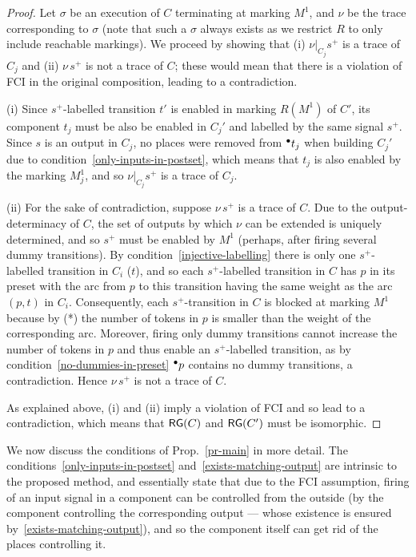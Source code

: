 \begin{proof}
Let $\sigma$ be an execution of $C$ terminating at marking $M^1$,
and $\nu$ be the trace corresponding to $\sigma$ (note that
such a $\sigma$ always exists as we restrict $R$ to only include reachable markings).
We proceed by showing that (i)
$\nu|_{C_j}s^+$ is a trace of $C_j$ and (ii) $\nu\, s^+$ is not
a trace of $C$; these would mean that there is a violation of
FCI in the original composition, leading to a contradiction.

(i) Since $s^+$-labelled transition $t'$ is enabled in marking $R(M^1)$ of $C'$, 
its component $t_j$ must be also be enabled in $C_j'$ and labelled by the same signal $s^+$.
Since $s$ is an output in $C_j$, no places were removed from ${}^\bullet {t_j}$ when building
$C_j'$ due to condition~\ref{only-inputs-in-postset}, which
means that $t_j$ is also enabled by the marking $M^1_j$, and so $\nu|_{C_j}s^+$
is a trace of $C_j$.

(ii) For the sake of contradiction, suppose $\nu\,s^+$ is a
trace of $C$. Due to the output-determinacy of $C$, the set of
outputs by which $\nu$ can be extended is uniquely determined,
and so $s^+$ must be enabled by $M^1$ (perhaps, after firing
several dummy transitions). By
condition~\ref{injective-labelling} there is only one
$s^+$-labelled transition in $C_i$ (\viz $t$), and so each
$s^+$-labelled transition in $C$ has $p$ in its preset with the
arc from $p$ to this transition having the same weight as the
arc $(p,t)$ in $C_i$. Consequently, each $s^+$-transition in
$C$ is blocked at marking $M^1$ because by (*) the number of tokens
in $p$ is smaller than the weight of the corresponding arc.
Moreover, firing only dummy transitions cannot increase the
number of tokens in $p$ and thus enable an $s^+$-labelled
transition, as by condition~\ref{no-dummies-in-preset}
${}^\bullet {p}$ contains no dummy transitions, a contradiction. Hence
$\nu\,s^+$ is not a trace of $C$.

As explained above, (i) and (ii) imply a violation of FCI and
so lead to a contradiction, which means that $\mathsf{RG}(C)$ and
$\mathsf{RG}(C')$ must be isomorphic.


\end{proof}

We now discuss the conditions of Prop.~\ref{pr-main} in more
detail. The conditions~\ref{only-inputs-in-postset}
and~\ref{exists-matching-output} are intrinsic to the proposed
method, and essentially state that due to the FCI assumption,
firing of an input signal in a component can be controlled from
the outside (\viz by the component controlling the
corresponding output --- whose existence is ensured
by~\ref{exists-matching-output}), and so the component itself
can get rid of the places controlling it.

